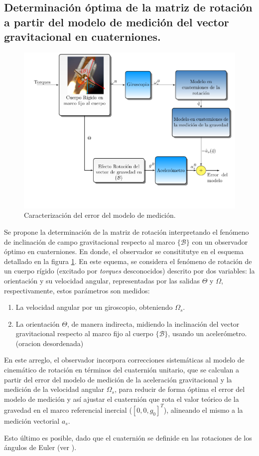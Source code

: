 \documentclass[conference]{IEEEtran}
\newcommand{\marco}[1]{\{\mathcal{#1}\}}
\begin{document}
\subsection{Determinación óptima de la matriz de rotación a partir del modelo de medición del vector gravitacional en cuaterniones.}
\begin{figure} [t]
\begin{center}
\includegraphics[scale=0.50,viewport=20 50 430 330,clip]{ObsOptimo_fig3.pdf}
\caption{Caracterización del error del modelo de medición.}
\label{ObsOptimo_fig2}
\end{center}
\end{figure}
Se propone la determinación de la matriz de rotación interpretando el fenómeno de inclinación de campo gravitacional respecto al marco $\marco{B}$ con un observador óptimo en cuaterniones. En donde, el observador se consititutye en el esquema detallado en la figura \ref{ObsOptimo_fig2}. En este equema, se considera el fenómeno de rotación de un cuerpo rígido (excitado por \emph{torques} desconocidos) descrito por dos variables: la orientación y su velocidad angular, representadas por las salidas $\Theta$ y $\Omega$, respectivamente, estos parámetros son medidos:
\begin{enumerate} 
\item La velocidad angular por un giroscopio, obteniendo $\Omega_s$.
\item La orientación $\Theta$, de manera indirecta, midiendo la inclinación del vector gravitacional respecto al marco fijo al cuerpo $\marco{B}$, usando un acelerómetro.(oracion desordenada)
\end{enumerate}
En este arreglo, el observador incorpora correcciones sistemáticas al modelo de cinemático de rotación en términos del cuaternión unitario, que se calculan a partir del error del modelo de medición de la aceleración gravitacional y la medición de la velocidad angular $\Omega_s$, para reducir de forma óptima el error del modelo de medición y así ajustar el cuaternión que rota el valor teórico de la gravedad en el marco referencial inercial ($[0,0,g_0]^T$), alineando el mismo a la medición vectorial $a_s$.\par
Esto último es posible, dado que el cuaternión se definide en las rotaciones de los ángulos de Euler (ver \cite{Altmann1986}).\par
\end{document}
